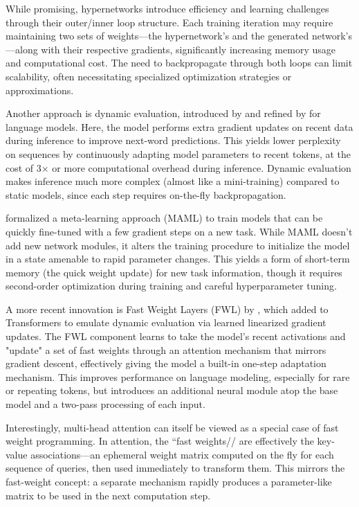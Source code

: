 \documentclass{article} %
\begin{document}
While promising, hypernetworks introduce efficiency and learning challenges through their outer/inner loop structure. Each training iteration may require maintaining two sets of weights—the hypernetwork's and the generated network's—along with their respective gradients, significantly increasing memory usage and computational cost. The need to backpropagate through both loops can limit scalability, often necessitating specialized optimization strategies or approximations.

Another approach is dynamic evaluation, introduced by \citet{mikolovRecurrentNeuralNetwork2010} and refined by \citet{pmlr-v80-krause18a} for language models. Here, the model performs extra gradient updates on recent data during inference to improve next-word predictions. This yields lower perplexity on sequences by continuously adapting model parameters to recent tokens, at the cost of 3× or more computational overhead during inference. Dynamic evaluation makes inference much more complex (almost like a mini-training) compared to static models, since each step requires on-the-fly backpropagation.

\citet{finnModelagnosticMetalearningFast2017} formalized a meta-learning approach (MAML) to train models that can be quickly fine-tuned with a few gradient steps on a new task. While MAML doesn't add new network modules, it alters the training procedure to initialize the model in a state amenable to rapid parameter changes. This yields a form of short-term memory (the quick weight update) for new task information, though it requires second-order optimization during training and careful hyperparameter tuning.

A more recent innovation is Fast Weight Layers (FWL) by \citet{clark-etal-2022-meta}, which added to Transformers to emulate dynamic evaluation via learned linearized gradient updates. The FWL component learns to take the model's recent activations and "update" a set of fast weights through an attention mechanism that mirrors gradient descent, effectively giving the model a built-in one-step adaptation mechanism. This improves performance on language modeling, especially for rare or repeating tokens, but introduces an additional neural module atop the base model and a two-pass processing of each input.

Interestingly, multi-head attention can itself be viewed as a special case of fast weight programming. In attention, the ``fast weights// are effectively the key-value associations—an ephemeral weight matrix computed on the fly for each sequence of queries, then used immediately to transform them. This mirrors the fast-weight concept: a separate mechanism rapidly produces a parameter-like matrix to be used in the next computation step.
\end{document}
